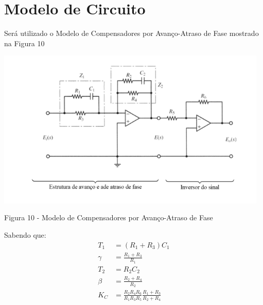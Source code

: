 \documentclass[a4paper]{article}
\begin{document}
\section{Modelo de Circuito}
\par Será utilizado o Modelo de Compensadores por Avanço-Atraso de Fase mostrado na Figura 10
\begin{center}
	\includegraphics[width=35em,keepaspectratio]{circuito}
	\par Figura 10 -  Modelo de Compensadores por Avanço-Atraso de Fase
\end{center}
\par Sabendo que:
\begin{align}
	T_1 &= (R_1+R_3)C_1 \\
	\gamma &= \frac{R_1+R_3}{R_1} \\
	T_2 &= R_2C_2 \\
	\beta &= \frac{R_2+R_4}{R_2} \\
	K_C &= \frac{R_2R_4R_6}{R_1R_3R_5} \frac{R_1+R_3}{R_2+R_4}
\end{align}
\end{document}
